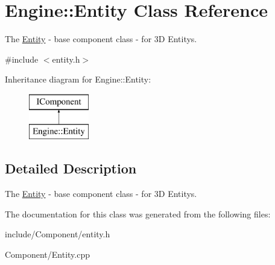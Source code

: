 \hypertarget{classEngine_1_1Entity}{}\section{Engine\+:\+:Entity Class Reference}
\label{classEngine_1_1Entity}


The \hyperlink{classEngine_1_1Entity}{Entity} -\/ base component class -\/ for 3\+D Entitys.  




{\ttfamily \#include $<$entity.\+h$>$}

Inheritance diagram for Engine\+:\+:Entity\+:\begin{figure}[H]
\begin{center}
\leavevmode
\includegraphics[height=2.000000cm]{classEngine_1_1Entity}
\end{center}
\end{figure}


\subsection{Detailed Description}
The \hyperlink{classEngine_1_1Entity}{Entity} -\/ base component class -\/ for 3\+D Entitys. 

The documentation for this class was generated from the following files\+:\begin{DoxyCompactItemize}
\item 
include/\+Component/entity.\+h\item 
Component/Entity.\+cpp\end{DoxyCompactItemize}
